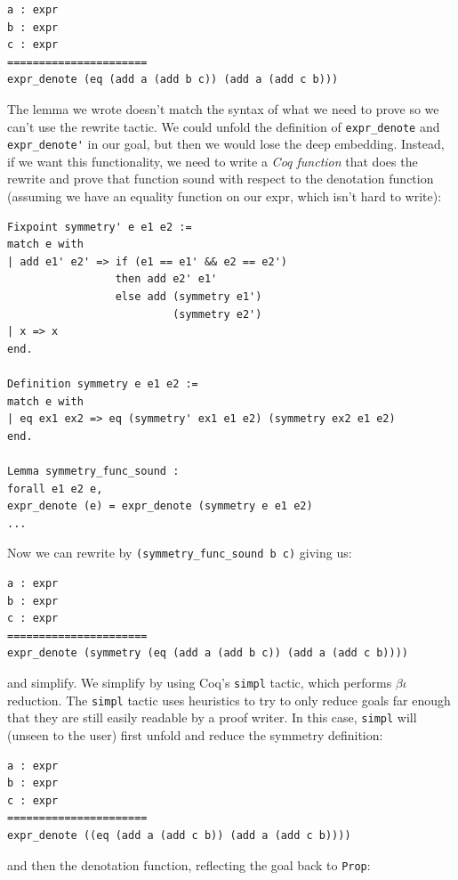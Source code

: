 \documentclass{puthesis}
\begin{document}
\begin{lstlisting}
a : expr
b : expr
c : expr
======================
expr_denote (eq (add a (add b c)) (add a (add c b)))  
\end{lstlisting}

The lemma we wrote doesn't match the syntax of what we need to prove
so we can't use the rewrite tactic. We could unfold the definition of
\lstinline|expr_denote| and \lstinline|expr_denote'| in our goal, but
then we would lose the deep embedding. Instead, if we want this
functionality, we need to write a \emph{Coq function} that does the
rewrite and prove that function sound with respect to the denotation
function (assuming we have an equality function on our expr, which
isn't hard to write):

\begin{lstlisting}
Fixpoint symmetry' e e1 e2 := 
match e with
| add e1' e2' => if (e1 == e1' && e2 == e2') 
                 then add e2' e1' 
                 else add (symmetry e1') 
                          (symmetry e2')
| x => x
end.

Definition symmetry e e1 e2 :=
match e with
| eq ex1 ex2 => eq (symmetry' ex1 e1 e2) (symmetry ex2 e1 e2)
end.

Lemma symmetry_func_sound : 
forall e1 e2 e,
expr_denote (e) = expr_denote (symmetry e e1 e2)
...
\end{lstlisting}

Now we can rewrite by \lstinline|(symmetry_func_sound b c)| giving us:

\begin{lstlisting}
a : expr
b : expr
c : expr
======================
expr_denote (symmetry (eq (add a (add b c)) (add a (add c b))))  
\end{lstlisting}

and simplify. We simplify by using Coq's \lstinline|simpl| tactic,
which performs $\beta\iota$ reduction. The \lstinline|simpl| tactic uses
heuristics to try to only reduce goals far enough that they are still
easily readable by a proof writer. In this case, \lstinline|simpl| 
will (unseen to the user) first unfold and reduce the symmetry
definition:

\begin{lstlisting}
a : expr
b : expr
c : expr
======================
expr_denote ((eq (add a (add c b)) (add a (add c b))))  
\end{lstlisting}

\noindent and then the denotation function, reflecting the goal back
to \lstinline|Prop|:
\end{document}
